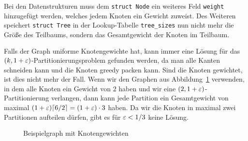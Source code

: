 Bei den Datenstrukturen muss dem \texttt{struct Node} ein weiteres Feld \texttt{weight} hinzugefügt werden, welches jedem Knoten ein Gewicht zuweist.
Des Weiteren speichert \texttt{struct Tree} in der Lookup-Tabelle \texttt{tree\_sizes} nun nicht mehr die Größe des Teilbaums, sondern das Gesamtgewicht der Knoten im Teilbaum.

\begin{rem}
    Falls der Graph uniforme Knotengewichte hat, kann immer eine Lösung für das $(k,1+\varepsilon)$\hyp Partitionierungsproblem gefunden werden, da man alle Kanten schneiden kann und die Knoten greedy packen kann.
    Sind die Knoten gewichtet, ist dies nicht mehr der Fall.
    Wenn wir den Graphen aus Abbildung~\ref{fig:graph} verwenden, in dem alle Knoten ein Gewicht von $2$ haben und wir eine $(2, 1 + \varepsilon)$\hyp Partitionierung verlangen, dann kann jede Partition ein Gesamtgewicht von maximal $(1 + \varepsilon) \lceil6/2\rceil = (1 + \varepsilon) \cdot 3$ haben.
    Da wir die Knoten in maximal zwei Partitionen aufteilen dürfen, gibt es für $\varepsilon < 1/3$ keine Lösung.
\end{rem}

\begin{figure}
    \centering
    \caption{Beispielgraph mit Knotengewichten\label{fig:graph}}
\end{figure}
